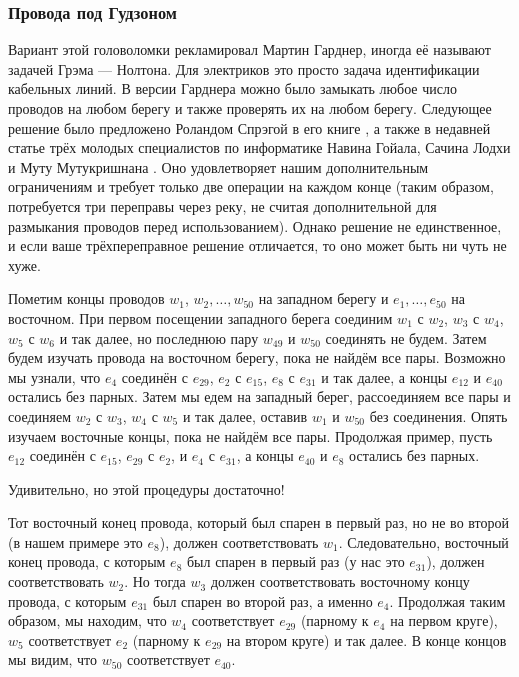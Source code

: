 

\subsubsection*{Провода под Гудзоном}

Вариант этой головоломки рекламировал Мартин Гарднер,
иногда её называют задачей Грэма --- Нолтона.
Для электриков это просто задача идентификации кабельных линий.
В версии Гарднера можно было замыкать любое число проводов на любом берегу и также проверять их на любом берегу.
Следующее решение было предложено Роландом Спрэгой в его книге \cite{54}, а также в недавней статье трёх молодых специалистов по информатике Навина Гойала, Сачина Лодхи и Муту Мутукришнана \cite{33}.
Оно удовлетворяет нашим дополнительным ограничениям и требует только две операции на каждом конце (таким образом, потребуется три переправы через реку, не считая дополнительной для размыкания проводов перед использованием).
Однако решение не единственное, и если ваше трёхпереправное решение отличается, то оно может быть ни чуть не хуже.

Пометим концы проводов $w_1$, $w_2, \dots, w_{50}$ на западном берегу
и $e_1, \dots, e_{50}$ на восточном. %
При первом посещении западного берега соединим $w_1$ с $w_2$, $w_3$ с $w_4$, $w_5$ с $w_6$ и так далее, но последнюю пару $w_{49}$ и $w_{50}$ соединять не будем.
Затем будем изучать провода на восточном берегу, пока не найдём все пары.
Возможно мы узнали, что $e_4$ соединён с $e_{29}$, $e_2$ с $e_{15}$, $e_8$ с $e_{31}$ и так далее, а концы $e_{12}$ и $e_{40}$ остались без парных.
Затем мы едем на западный берег, рассоединяем все пары и соединяем $w_2$ с $w_3$, $w_4$ с $w_5$ и так далее, оставив $w_1$ и $w_{50}$ без соединения.
Опять изучаем восточные концы, пока не найдём все пары.
Продолжая пример, пусть $e_{12}$ соединён с $e_{15}$, $e_{29}$ с $e_2$, и $e_4$ с $e_{31}$, а концы $e_{40}$ и $e_8$ остались без парных.

Удивительно, но этой процедуры достаточно!

Тот восточный конец провода, который был спарен в первый раз, но не во второй (в нашем примере это $e_8$), должен соответствовать $w_1$.
Следовательно, восточный конец провода, с которым $e_8$ был спарен в первый раз (у нас это $e_{31}$), должен соответствовать $w_2$.
Но тогда $w_3$ должен соответствовать восточному концу провода, с которым $e_{31}$ был спарен во второй раз, а именно $e_4$.
Продолжая таким образом, мы находим, что $w_4$ соответствует $e_{29}$ (парному к $e_4$ на первом круге), $w_5$ соответствует $e_2$ (парному к $e_{29}$ на втором круге) и так далее.
В конце концов мы видим, что $w_{50}$ соответствует $e_{40}$.

